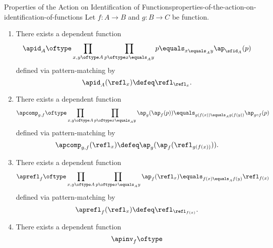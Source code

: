 \begin{proposition}{Properties of the Action on Identification of Functions}{properties-of-the-action-on-identification-of-functions}%
    Let $f\colon A\to B$ and $g\colon B\to C$ be function.
    \begin{enumerate}
        \item\label{properties-of-the-action-on-identification-of-functions-interaction-with-identities}There exists a dependent function
            \[
                \apid_{A}%
                \oftype%
                \prod_{x,y\oftype A}%
                \prod_{p\oftype x\equals_{A}y}%
                p\equals_{x\equals_{A}y}\ap_{\sfid_{A}}(p)%
            \]%
            defined via pattern-matching by
            \[
                \apid_{A}(\refl_{x})%
                \defeq%
                \refl_{\refl_{x}}.%
            \]%
        \item\label{properties-of-the-action-on-identification-of-functions-interaction-with-composition}There exists a dependent function
            \[
                \apcomp_{g,f}%
                \oftype%
                \prod_{x,y\oftype A}%
                \prod_{p\oftype x\equals_{A}y}%
                \ap_{g}(\ap_{f}(p))%
                \equals_{g(f(x))\equals_{A}g(f(y))}%
                \ap_{g\circ f}(p)%
            \]%
            defined via pattern-matching by
            \[
                \apcomp_{g,f}(\refl_{x})%
                \defeq%
                \ap_{g}(\ap_{f}(\refl_{g(f(x))})).%
            \]%
        \item\label{properties-of-the-action-on-identification-of-functions-interaction-with-reflexivity}There exists a dependent function
            \[
                \aprefl_{f}%
                \oftype%
                \prod_{x,y\oftype A}%
                \prod_{p\oftype x\equals_{A}y}%
                \ap_{f}(\refl_{x})%
                \equals_{f(x)\equals_{A}f(y)}%
                \refl_{f(x)}%
            \]%
            defined via pattern-matching by
            \[
                \aprefl_{f}(\refl_{x})%
                \defeq%
                \refl_{\refl_{f(x)}}.%
            \]%
        \item\label{properties-of-the-action-on-identification-of-functions-interaction-with-inversion}There exists a dependent function
            \[
                \apinv_{f}%
                \oftype%
\]
\end{enumerate}
\end{proposition}
